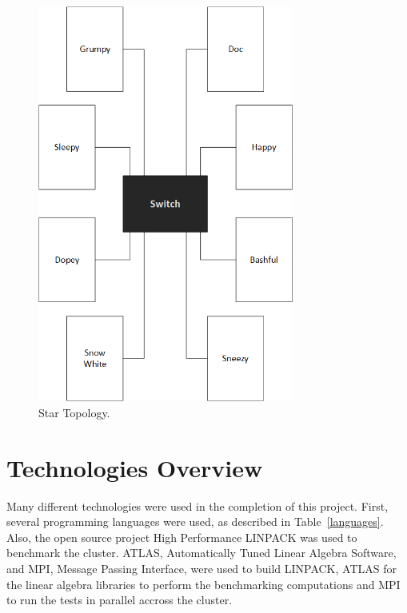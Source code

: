 \begin{figure}[tbh]
\begin{center}
\includegraphics[width=0.75\textwidth]{cluster_star.png}
\end{center}
\caption{Star Topology. \label{star}}
\end{figure}

\section{Technologies Overview}

Many different technologies were used in the completion of this project. First, several programming languages were used, as described in Table~\ref{languages}. Also, the open source project High Performance LINPACK was used to benchmark the cluster. ATLAS, Automatically Tuned Linear Algebra Software, and MPI, Message Passing Interface, were used to build LINPACK, ATLAS for the linear algebra libraries to perform the benchmarking computations and MPI to run the tests in parallel accross the cluster.

